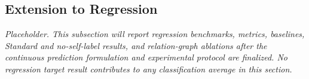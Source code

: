 \subsection{Extension to Regression}
\label{sec:exp:regression-placeholder}

\emph{Placeholder. This subsection will report regression benchmarks,
metrics, baselines, Standard and no-self-label results, and relation-graph
ablations after the continuous prediction formulation and experimental
protocol are finalized. No regression target result contributes to any
classification average in this section.}
